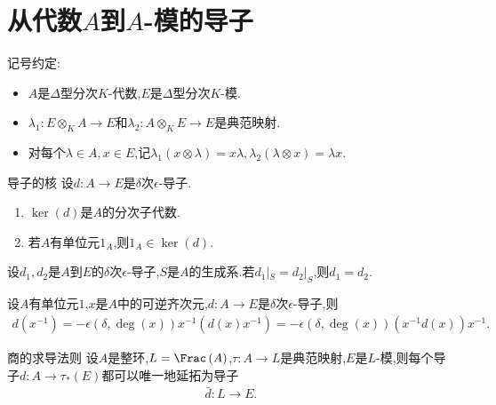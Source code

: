 \section{从代数\texorpdfstring{$A$}{A}到\texorpdfstring{$A$}{A}-模的导子}

记号约定:
\begin{itemize}
	\item $A$是$\Delta$型分次$K$-代数,$E$是$\Delta$型分次$K$-模.
	\item $\lambda_{1}:E\otimes_{K}A\to E$和$\lambda_{2}:A\otimes_{K}E\to E$是典范映射.
	\item 对每个$\lambda\in A,x\in E$,记$\lambda_{1}\left(x\otimes\lambda\right)=x\lambda,\lambda_{2}\left(\lambda\otimes x\right)=\lambda x$.
\end{itemize}

\begin{proposition}{导子的核}{}
	设$d:A\to E$是$\delta$次$\epsilon$-导子.
	\begin{enumerate}
		\item $\ker\left(d\right)$是$A$的分次子代数.
		\item 若$A$有单位元$1_{A}$,则$1_{A}\in\ker\left(d\right)$.
	\end{enumerate}
\end{proposition}

\begin{corollary}{}{}
	设$d_{1},d_{2}$是$A$到$E$的$\delta$次$\epsilon$-导子,$S$是$A$的生成系.若$d_{1}|_{S}=d_{2}|_{S}$,则$d_{1}=d_{2}$.
\end{corollary}

\begin{proposition}{}{}
	设$A$有单位元$1$,$x$是$A$中的可逆齐次元,$d:A\to E$是$\delta$次$\epsilon$-导子,则
	\begin{align*}
		d\left(x^{-1}\right)=-\epsilon\left(\delta,\deg\left(x\right)\right)x^{-1}\left(d\left(x\right)x^{-1}\right)=-\epsilon\left(\delta,\deg\left(x\right)\right)\left(x^{-1}d\left(x\right)\right)x^{-1}.
	\end{align*}
\end{proposition}

\begin{proposition}{商的求导法则}{}
	设$A$是整环,$L=\Frac\left(A\right)$,$\tau:A\to L$是典范映射,$E$是$L$-模,则每个导子$d:A\to\tau_{\ast}\left(E\right)$都可以唯一地延拓为导子
	\begin{align*}
		\bar{d}:L\to E.
	\end{align*}
\end{proposition}

